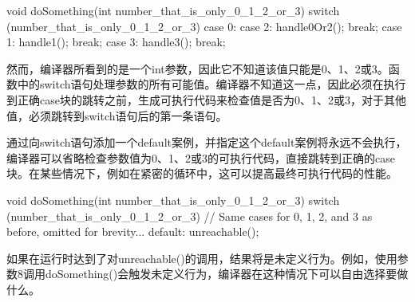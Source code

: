 \begin{cpp}
void doSomething(int number_that_is_only_0_1_2_or_3)
{
    switch (number_that_is_only_0_1_2_or_3) {
        case 0:
        case 2:
            handle0Or2(); break;
        case 1:
            handle1(); break;
        case 3:
            handle3(); break;
    }
}
\end{cpp}

然而，编译器所看到的是一个int参数，因此它不知道该值只能是0、1、2或3。函数中的switch语句处理参数的所有可能值。编译器不知道这一点，因此必须在执行到正确case块的跳转之前，生成可执行代码来检查值是否为0、1、2或3，对于其他值，必须跳转到switch语句后的第一条语句。

通过向switch语句添加一个default案例，并指定这个default案例将永远不会执行，编译器可以省略检查参数值为0、1、2或3的可执行代码，直接跳转到正确的case块。在某些情况下，例如在紧密的循环中，这可以提高最终可执行代码的性能。

\begin{cpp}
void doSomething(int number_that_is_only_0_1_2_or_3)
{
    switch (number_that_is_only_0_1_2_or_3) {
        // Same cases for 0, 1, 2, and 3 as before, omitted for brevity...
        default:
            unreachable();
    }
}
\end{cpp}

如果在运行时达到了对unreachable()的调用，结果将是未定义行为。例如，使用参数8调用doSomething()会触发未定义行为，编译器在这种情况下可以自由选择要做什么。











